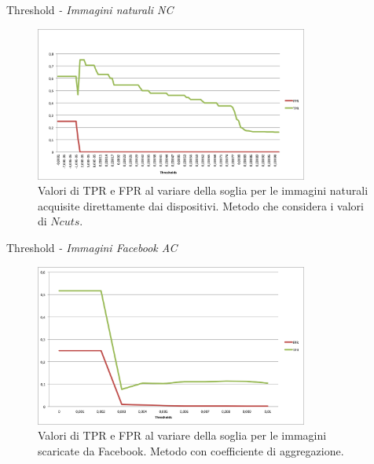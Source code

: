 \begin{tframe}{Threshold \emph{- Immagini naturali NC}}

\begin{figure}[h]
\begin{center}
\includegraphics[width=0.8\textwidth]{../images/soglia_imgnat_NC.png}
\end{center}
  \caption{Valori di TPR e FPR al variare della soglia per le immagini naturali acquisite direttamente dai dispositivi. Metodo che considera i valori di $Ncuts$.}
\label{fig:soglia AC}
\end{figure}

\end{tframe}

\begin{tframe}{Threshold \emph{- Immagini Facebook AC}}

\begin{figure}[h]
\begin{center}
\includegraphics[width=0.8\textwidth]{../images/soglia_imgnat_fb_AC.png}
\end{center}
  \caption{Valori di TPR e FPR al variare della soglia per le immagini scaricate da Facebook. Metodo con coefficiente di aggregazione.}
\label{fig:soglia AC}
\end{figure}

\end{tframe}

